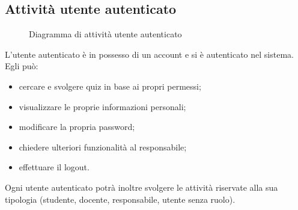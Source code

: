 \documentclass[a4paper, titlepage]{article}
\begin{document}
\newpage
\subsection{Attività utente autenticato}
\begin{figure}[H]
	\centering
	\noindent{}
	\caption{Diagramma di attività utente autenticato}
\end{figure}
L’utente autenticato è in possesso di un account e si è autenticato nel sistema. Egli può:
\begin{itemize} 
	\item cercare e svolgere quiz in base ai propri permessi; 
	\item visualizzare le proprie informazioni personali;
	\item modificare la propria password;
	\item chiedere ulteriori funzionalità al responsabile;
	\item effettuare il logout.
\end{itemize} 
Ogni utente autenticato potrà inoltre svolgere le attività riservate alla sua tipologia (studente, docente, responsabile, utente senza ruolo).

\newpage
\end{document}
